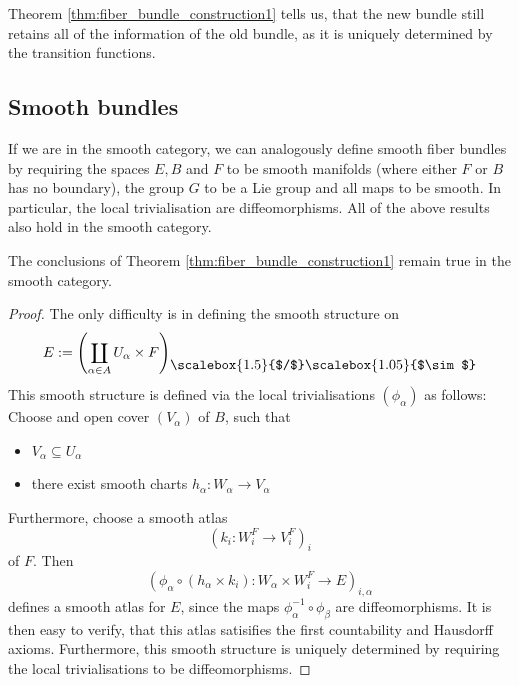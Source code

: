     Theorem \ref{thm:fiber_bundle_construction1} tells us, that the new bundle still retains all of the information of the old bundle, as it is uniquely determined by the transition functions.

    \subsection{Smooth bundles}

    \noindent If we are in the smooth category, we can analogously define smooth fiber bundles by requiring the spaces $E ,B$ and $F$ to be smooth manifolds (where either $F$ or $B$ has no boundary), the group $G$ to be a Lie group and all maps to be smooth. In particular, the local trivialisation are diffeomorphisms. All of the above results also hold in the smooth category. 

    \begin{theorem}
        The conclusions of Theorem \ref{thm:fiber_bundle_construction1} remain true in the smooth category. 
    \end{theorem}
    \begin{proof}
        The only difficulty is in defining the smooth structure on 
        \[
            E := \left( \coprod_{\alpha \in A} U_\alpha \times F \right)_{\raisebox{5pt}{\scalebox{1.5}{$/$}}\raisebox{5pt}{\scalebox{1.05}{$\sim$}}}
        \]
        This smooth structure is defined via the local trivialisations $(\phi_\alpha)$ as follows: Choose and open cover $(V_\alpha)$ of $B$, such that
        \begin{itemize}
            \item $V_\alpha \subseteq U_\alpha$
            \item there exist smooth charts $h_\alpha \colon W_\alpha \to V_\alpha$
        \end{itemize}
        Furthermore, choose a smooth atlas
        \[
        (k_i \colon W_i^F \to V_i^F)_i
        \]
        of $F$. Then 
        \[
        (\phi_\alpha \circ (h_\alpha \times k_i) \colon W_\alpha \times W_i^F \to E)_{i,\alpha}
        \]
        defines a smooth atlas for $E$, since the maps $\phi_\alpha^{-1} \circ \phi_\beta$ are diffeomorphisms. It is then easy to verify, that this atlas satisifies the first countability and Hausdorff axioms. Furthermore, this smooth structure is uniquely determined by requiring the local trivialisations to be diffeomorphisms.
    \end{proof}

